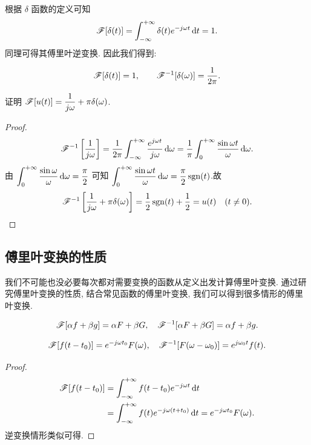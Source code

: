 \documentclass[nocolor,theme=doremi,lang=cn,11pt,chinese,twoside,openright,usesamecnt]{elegantbook}
\makeatletter
\newenvironment{block}[1]{\begin{tcolorbox}[blockstyle,title=#1]}{\end{tcolorbox}}
\newenvironment{alertblock@}{\begin{tcolorbox}[alertstyle,notitle]}{\end{tcolorbox}}
\makeatother
\begin{document}
根据 $\delta$ 函数的定义可知
\[\mathscr{F}[\delta(t)]=\int_{-\infty}^{+\infty}\delta(t)e^{-j\omega t}\,\mathrm{d} t=1.\]
同理可得其傅里叶逆变换.
因此我们得到:
\begin{alertblock@}
	\[\mathscr{F}[\delta(t)]=1,\qquad
	\mathscr{F}^{-1}[\delta(\omega)]=\dfrac1{2\pi}.\]
\end{alertblock@}

\begin{example}
	证明 \emph{$\mathscr{F}[u(t)]=\dfrac1{j\omega}+\pi\delta(\omega)$}.
\end{example}

\begin{proof}
		\[\mathscr{F}^{-1}\left[\frac1{j\omega}\right]
		=\frac1{2\pi}\int_{-\infty}^{+\infty}\frac{e^{j\omega t}}{j\omega} \,\mathrm{d}\omega
		=\frac1\pi\int_0^{+\infty}\frac{\sin\omega t}{\omega} \,\mathrm{d}\omega.\]
	{由
		$\displaystyle\int_0^{+\infty}\frac{\sin\omega}\omega \,\mathrm{d}\omega=\dfrac\pi2$
		可知
		$\displaystyle\int_0^{+\infty}\frac{\sin\omega t}\omega \,\mathrm{d}\omega=\frac\pi2\operatorname{sgn}(t)$.故
		\[\mathscr{F}^{-1} \left[\frac1{j\omega}+\pi\delta(\omega)\right]
		=\frac{1}{2}\operatorname{sgn}(t)+\frac{1}{2} =u(t)\quad (t\neq 0).\qedhere\]
	}
\end{proof}

\subsection{傅里叶变换的性质}

我们不可能也没必要每次都对需要变换的函数从定义出发计算傅里叶变换.
通过研究傅里叶变换的性质, 结合常见函数的傅里叶变换, 我们可以得到很多情形的傅里叶变换.

\begin{block}{线性性质}
	\[\mathscr{F}[\alpha f+\beta g]=\alpha F+\beta G,\quad
	\mathscr{F}^{-1}[\alpha F+\beta G]=\alpha f+\beta g.\]
\end{block}

\begin{block}{位移性质}
	\[\mathscr{F}[f(t-t_0)]=e^{-j\omega t_0}F(\omega),\quad
	\mathscr{F}^{-1}[F(\omega-\omega_0)]=e^{j\omega_0 t}f(t).\]
\end{block}

\begin{proof}
	\begin{align*}
		\mathscr{F}[f(t-t_0)]&=\int_{-\infty}^{+\infty}f(t-t_0)e^{-j\omega t}\,\mathrm{d} t\\
		&=\int_{-\infty}^{+\infty}f(t)e^{-j\omega (t+t_0)}\,\mathrm{d} t=e^{-j\omega t_0}F(\omega).
	\end{align*}
	{逆变换情形类似可得.\qedhere}
\end{proof}
\end{document}
